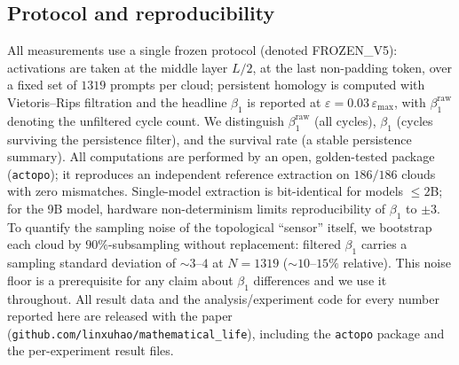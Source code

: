 \documentclass{article}
\begin{document}
\subsection{Protocol and reproducibility}
\label{sec:empirical-protocol}
All measurements use a single frozen protocol (denoted FROZEN\_V5): activations are taken at
the middle layer \(L/2\), at the last non-padding token, over a fixed set of \(1319\) prompts
per cloud; persistent homology is computed with Vietoris--Rips filtration and the headline
\(\beta_1\) is reported at \(\varepsilon = 0.03\,\varepsilon_{\max}\), with \(\beta_1^{\text{raw}}\)
denoting the unfiltered cycle count. We distinguish \(\beta_1^{\text{raw}}\) (all cycles),
\(\beta_1\) (cycles surviving the persistence filter), and the survival rate (a stable
persistence summary). All computations are performed by an open, golden-tested package
(\texttt{actopo}); it reproduces an independent reference extraction on \(186/186\) clouds with
zero mismatches. Single-model extraction is bit-identical for models \(\le 2\)B; for the 9B
model, hardware non-determinism limits reproducibility of \(\beta_1\) to \(\pm 3\). To quantify
the sampling noise of the topological ``sensor'' itself, we bootstrap each cloud by
\(90\%\)-subsampling without replacement: filtered \(\beta_1\) carries a sampling standard
deviation of \(\sim\!3\)--\(4\) at \(N=1319\) (\(\sim\!10\)--\(15\%\) relative). This noise floor
is a prerequisite for any claim about \(\beta_1\) differences and we use it throughout. All result
data and the analysis/experiment code for every number reported here are released with the paper
(\texttt{github.com/linxuhao/mathematical\_life}), including the \texttt{actopo} package and the
per-experiment result files.
\end{document}
